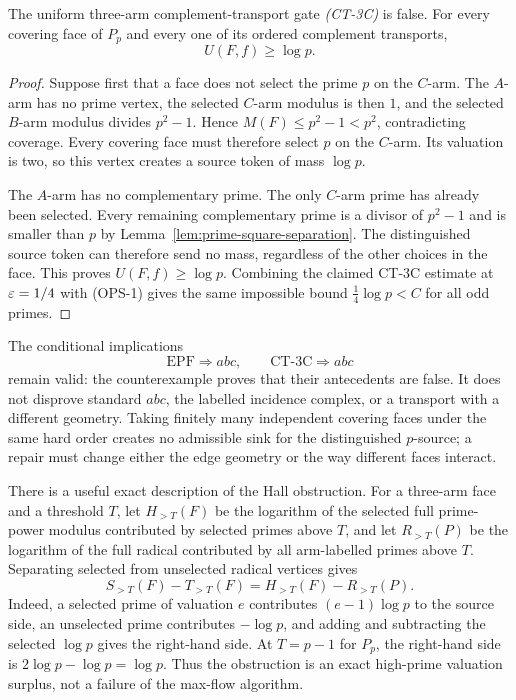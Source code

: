 \begin{theorem}
\label{thm:three-arm-ordered-flow-obstruction}
The uniform three-arm complement-transport gate \emph{(CT-3C)} is false.
For every covering face of $P_p$ and every one of its ordered complement
transports,
\[
 U(F,f)\ge\log p.
\]
\end{theorem}

\begin{proof}
Suppose first that a face does not select the prime $p$ on the $C$-arm.  The
$A$-arm has no prime vertex, the selected $C$-arm modulus is then $1$, and
the selected $B$-arm modulus divides $p^2-1$.  Hence
$M(F)\le p^2-1<p^2$, contradicting coverage.  Every covering face must
therefore select $p$ on the $C$-arm.  Its valuation is two, so this vertex
creates a source token of mass $\log p$.

The $A$-arm has no complementary prime.  The only $C$-arm prime has already
been selected.  Every remaining complementary prime is a divisor of
$p^2-1$ and is smaller than $p$ by
Lemma~\ref{lem:prime-square-separation}.  The distinguished source token can
therefore send no mass, regardless of the other choices in the face.  This
proves $U(F,f)\ge\log p$.  Combining the claimed CT-3C estimate at
$\varepsilon=1/4$ with (OPS-1) gives the same impossible bound
$\frac14\log p<C$ for all odd primes.
\end{proof}

The conditional implications
\[
 \mathrm{EPF}\Longrightarrow abc,
 \qquad \mathrm{CT\text{-}3C}\Longrightarrow abc
\]
remain valid: the counterexample proves that their antecedents are false.
It does not disprove standard $abc$, the labelled incidence complex, or a
transport with a different geometry.  Taking finitely many independent
covering faces under the same hard order creates no admissible sink for the
distinguished $p$-source; a repair must change either the edge geometry or the
way different faces interact.

There is a useful exact description of the Hall obstruction.  For a
three-arm face and a threshold $T$, let $H_{>T}(F)$ be the logarithm of the
selected full prime-power modulus contributed by selected primes above $T$,
and let $R_{>T}(P)$ be the logarithm of the full radical contributed by all
arm-labelled primes above $T$.  Separating selected from unselected radical
vertices gives
\[
 S_{>T}(F)-T_{>T}(F)=H_{>T}(F)-R_{>T}(P).
\tag{OPS-2}
\]
Indeed, a selected prime of valuation $e$ contributes $(e-1)\log p$ to the
source side, an unselected prime contributes $-\log p$, and adding and
subtracting the selected $\log p$ gives the right-hand side.  At
$T=p-1$ for $P_p$, the right-hand side is $2\log p-\log p=\log p$.
Thus the obstruction is an exact high-prime valuation surplus, not a failure
of the max-flow algorithm.

